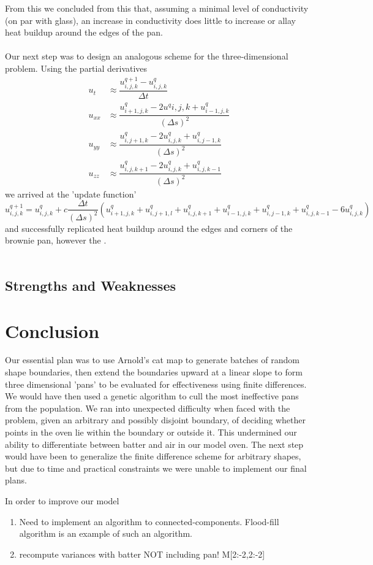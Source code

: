 \documentclass[12pt,draft]{reedmcm}
\begin{document}
From this we concluded from this that, assuming a minimal level of conductivity (on par with glass), an increase in conductivity does little to increase or allay heat buildup around the edges of the pan.\\
\\
Our next step was to design an analogous scheme for the three-dimensional problem.  Using the partial derivatives
\begin{align*}
u_t &\approx \dfrac{u_{i,j,k}^{q+1} - u_{i,j,k}^q}{\Delta t}\\
u_{xx} &\approx \dfrac{u_{i+1,j,k}^q - 2u^q{i,j,k} + u_{i-1,j,k}^q}{(\Delta s)^2}\\
u_{yy} &\approx \dfrac{u_{i,j+1,k}^q - 2u_{i,j,k}^q + u_{i,j-1,k}^q}{(\Delta s)^2}\\
u_{zz} &\approx \dfrac{u_{i,j,k+1}^q - 2u_{i,j,k}^q + u_{i,j,k-1}^q}{(\Delta s)^2} \end{align*} 
we arrived at the 'update function'
\[u^{q+1}_{i,j,k} = u^q_{i,j,k} + c \frac{\Delta t}{(\Delta s)^2} \left(u^q_{i+1,j,k} + u^q_{i,j+1,l} + u^q_{i,j,k+1} + u^q_{i-1,j,k} + u^q_{i,j-1,k} + u^q_{i,j,k-1} - 6u^q_{i,j,k} \right)\]
and successfully replicated heat buildup around the edges and corners of the brownie pan, however the .\\
\\



\subsection{Strengths and Weaknesses}

\section{Conclusion}
Our essential plan was to use Arnold's cat map to generate batches of random shape boundaries, then extend the boundaries upward at a linear slope to form three dimensional 'pans' to be evaluated for effectiveness using finite differences.  We would have then used a genetic algorithm to cull the most ineffective pans from the population.  We ran into unexpected difficulty when faced with the problem, given an arbitrary and possibly disjoint boundary, of deciding whether points in the oven lie within the boundary or outside it.  This undermined our ability to differentiate between batter and air in our model oven.  The next step would have been to generalize the finite difference scheme for arbitrary shapes, but due to time and practical constraints we were unable to implement our final plans. 

In order to improve our model
\begin{enumerate}
  \item Need to implement an algorithm to connected-components. Flood-fill algorithm is an example of such an algorithm.
  \item recompute variances with batter NOT including pan! M[2:-2,2:-2]
\end{enumerate}

\renewcommand{\bibname}{References}

\nocite{*}

\end{document}
